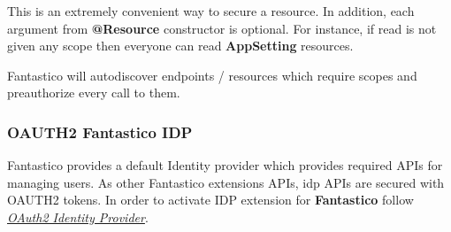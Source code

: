 \documentclass[letterpaper,10pt,english]{sphinxmanual}
\begin{document}
This is an extremely convenient way to secure a resource. In addition, each argument from \textbf{@Resource} constructor is optional.
For instance, if read is not given any scope then everyone can read \textbf{AppSetting} resources.

Fantastico will autodiscover endpoints / resources which require scopes and preauthorize every call to them.


\subsubsection{OAUTH2 Fantastico IDP}
\label{features/oauth2/idp:oauth2-fantastico-idp}\label{features/oauth2/idp::doc}
Fantastico provides a default Identity provider which provides required APIs for managing users. As other Fantastico
extensions APIs, idp APIs are secured with OAUTH2 tokens. In order to activate IDP extension for \textbf{Fantastico} follow
{\hyperref[features/components/oauth2/oauth2_idp/index::doc]{\emph{OAuth2 Identity Provider}}}.
\end{document}

